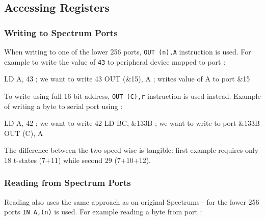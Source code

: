 \pagebreak

\subsection{Accessing Registers}
\label{zx_next_ports_examples}


\subsubsection{Writing to Spectrum Ports}

When writing to one of the lower 256 ports, {\tt OUT (n),A} instruction is used. For example to write the value of {\tt 43} to peripheral device mapped to port :

\begin{tcblisting}{}
	LD A, 43            ; we want to write 43
	OUT (&15), A        ; writes value of A to port &15
\end{tcblisting}

To write using full 16-bit address, {\tt OUT (C),r} instruction is used instead. Example of writing a byte to serial port using :

\begin{tcblisting}{}
	LD A, 42            ; we want to write 42
	LD BC, &133B        ; we want to write to port &133B
	OUT (C), A
\end{tcblisting}

The difference between the two speed-wise is tangible: first example requires only 18 t-states (7+11) while second 29 (7+10+12).


\subsubsection{Reading from Spectrum Ports}

Reading also uses the same approach as on original Spectrums - for the lower 256 ports {\tt IN A,(n)} is used. For example reading a byte from port :

